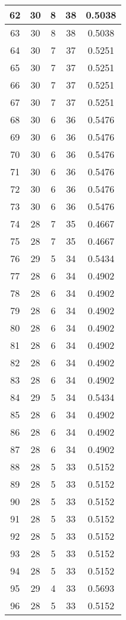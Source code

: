 \documentclass[letterpaper, 12pt]{article}
\begin{document}
\begin{longtable}{|c|c|c|c|c|}
\hline
62 & 30 & 8 & 38 & 0.5038 \\
\hline
63 & 30 & 8 & 38 & 0.5038 \\
\hline
64 & 30 & 7 & 37 & 0.5251 \\
\hline
65 & 30 & 7 & 37 & 0.5251 \\
\hline
66 & 30 & 7 & 37 & 0.5251 \\
\hline
67 & 30 & 7 & 37 & 0.5251 \\
\hline
68 & 30 & 6 & 36 & 0.5476 \\
\hline
69 & 30 & 6 & 36 & 0.5476 \\
\hline
70 & 30 & 6 & 36 & 0.5476 \\
\hline
71 & 30 & 6 & 36 & 0.5476 \\
\hline
72 & 30 & 6 & 36 & 0.5476 \\
\hline
73 & 30 & 6 & 36 & 0.5476 \\
\hline
74 & 28 & 7 & 35 & 0.4667 \\
\hline
75 & 28 & 7 & 35 & 0.4667 \\
\hline
76 & 29 & 5 & 34 & 0.5434 \\
\hline
77 & 28 & 6 & 34 & 0.4902 \\
\hline
78 & 28 & 6 & 34 & 0.4902 \\
\hline
79 & 28 & 6 & 34 & 0.4902 \\
\hline
80 & 28 & 6 & 34 & 0.4902 \\
\hline
81 & 28 & 6 & 34 & 0.4902 \\
\hline
82 & 28 & 6 & 34 & 0.4902 \\
\hline
83 & 28 & 6 & 34 & 0.4902 \\
\hline
84 & 29 & 5 & 34 & 0.5434 \\
\hline
85 & 28 & 6 & 34 & 0.4902 \\
\hline
86 & 28 & 6 & 34 & 0.4902 \\
\hline
87 & 28 & 6 & 34 & 0.4902 \\
\hline
88 & 28 & 5 & 33 & 0.5152 \\
\hline
89 & 28 & 5 & 33 & 0.5152 \\
\hline
90 & 28 & 5 & 33 & 0.5152 \\
\hline
91 & 28 & 5 & 33 & 0.5152 \\
\hline
92 & 28 & 5 & 33 & 0.5152 \\
\hline
93 & 28 & 5 & 33 & 0.5152 \\
\hline
94 & 28 & 5 & 33 & 0.5152 \\
\hline
95 & 29 & 4 & 33 & 0.5693 \\
\hline
96 & 28 & 5 & 33 & 0.5152 \\

\end{longtable}
\end{document}
